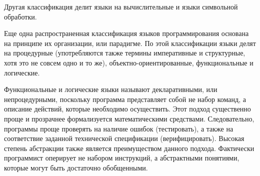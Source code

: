 Другая классификация делит языки на вычислительные и языки символьной обработки.

Еще одна распространенная классификация языков программирования основана на принципе их организации, или парадигме. По этой классификации языки делят на процедурные (употребляются также термины императивные и структурные, хотя это не совсем одно и то же), объектно-ориентированные, функциональные и логические.

Функциональные и логические языки называют декларативными, или непроцедурными, поскольку программа представляет собой не набор команд, а описание действий, которые необходимо осуществить. Этот подход существенно проще и прозрачнее формализуется математическими средствами. Следовательно, программы проще проверять на наличие ошибок (тестировать), а также на соответствие заданной технической спецификации (верифицировать). Высокая степень абстракции также является преимуществом данного подхода. Фактически программист оперирует не набором инструкций, а абстрактными понятиями, которые могут быть достаточно обобщенными.

